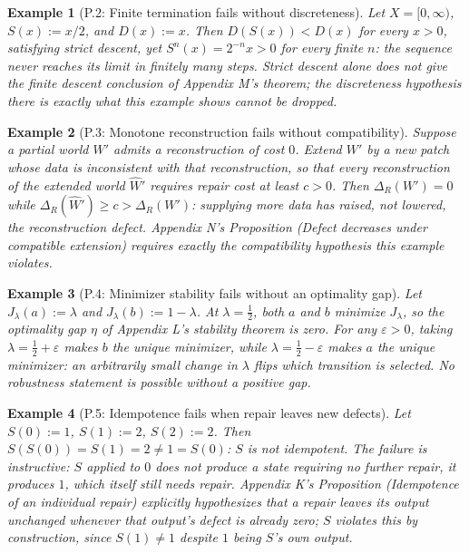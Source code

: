 \documentclass[11pt]{book}
\newtheorem*{appendixexample}{Example}
\begin{document}
\begin{appendixexample}[P.2: Finite termination fails without discreteness]
Let $X = [0,\infty)$, $S(x) := x/2$, and $D(x) := x$. Then $D(S(x)) < D(x)$ for every $x > 0$, satisfying strict descent, yet $S^n(x) = 2^{-n}x > 0$ for every finite $n$: the sequence never reaches its limit in finitely many steps. Strict descent alone does not give the finite descent conclusion of Appendix M's theorem; the discreteness hypothesis there is exactly what this example shows cannot be dropped.
\end{appendixexample}

\begin{appendixexample}[P.3: Monotone reconstruction fails without compatibility]
Suppose a partial world $W'$ admits a reconstruction of cost $0$. Extend $W'$ by a new patch whose data is inconsistent with that reconstruction, so that every reconstruction of the extended world $\widehat W'$ requires repair cost at least $c > 0$. Then $\Delta_R(W') = 0$ while $\Delta_R(\widehat W') \geq c > \Delta_R(W')$: supplying more data has raised, not lowered, the reconstruction defect. Appendix N's Proposition (Defect decreases under compatible extension) requires exactly the compatibility hypothesis this example violates.
\end{appendixexample}

\begin{appendixexample}[P.4: Minimizer stability fails without an optimality gap]
Let $J_\lambda(a) := \lambda$ and $J_\lambda(b) := 1-\lambda$. At $\lambda = \tfrac12$, both $a$ and $b$ minimize $J_\lambda$, so the optimality gap $\eta$ of Appendix L's stability theorem is zero. For any $\varepsilon > 0$, taking $\lambda = \tfrac12 + \varepsilon$ makes $b$ the unique minimizer, while $\lambda = \tfrac12 - \varepsilon$ makes $a$ the unique minimizer: an arbitrarily small change in $\lambda$ flips which transition is selected. No robustness statement is possible without a positive gap.
\end{appendixexample}

\begin{appendixexample}[P.5: Idempotence fails when repair leaves new defects]
Let $S(0) := 1$, $S(1) := 2$, $S(2) := 2$. Then $S(S(0)) = S(1) = 2 \neq 1 = S(0)$: $S$ is not idempotent. The failure is instructive: $S$ applied to $0$ does not produce a state requiring no further repair, it produces $1$, which itself still needs repair. Appendix K's Proposition (Idempotence of an individual repair) explicitly hypothesizes that a repair leaves its output unchanged whenever that output's defect is already zero; $S$ violates this by construction, since $S(1) \neq 1$ despite $1$ being $S$'s own output.
\end{appendixexample}
\end{document}
